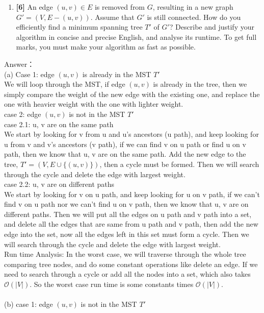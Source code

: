 \documentclass{assignment-263}
\begin{document}
\begin{enumerate}
\begin{enumerate}
			\item \textbf{[6]}
				An edge $(u, v)\in E$ is removed from $G$, resulting in a
				new graph $G'=(V, E-(u, v))$. Assume that $G'$ is still
				connected. How do you efficiently find a minimum spanning
				tree $T'$ of $G'$?  Describe and justify your algorithm in
				concise and precise English, and analyse its runtime. To get
				full marks, you must make your algorithm as fast as
				possible.
		\end{enumerate}
		Answer：\\
		(a)
		Case 1: edge $(u, v)$ is already in the MST $T'$ \\
		We will loop through the MST, if edge $(u, v)$ is already in the tree, then we simply compare the weight of the new edge with the existing one, and replace the one with heavier weight with the one with lighter weight.\\
		case 2: edge $(u, v)$ is not in the MST $T'$\\
	    case 2.1: u, v are on the same path\\
		We start by looking for v from u and u's ancestors (u path), and keep looking for u from v and v's ancestors (v path), if we can find v on u path or find u on v path, then we know that u, v are on the same path. Add the new edge to the tree, $T'=(V, E\cup \{(u,v)\})$, then a cycle must be formed. Then we will search through the cycle and delete the edge with largest weight.\\
		case 2.2: u, v are on different paths\\
		We start by looking for v on u path, and keep looking for u on v path, if we can't find v on u path nor we can't find u on v path, then we know that u, v are on different paths. Then we will put all the edges on u path and v path into a set, and delete all the edges that are same from u path and v path, then add the new edge into the set, now all the edges left in this set must form a cycle. Then we will search through the cycle and delete the edge with largest weight.\\
		Run time Analysis: In the worst case, we will traverse through the whole tree comparing tree nodes, and do some constant operations like delete an edge. If we need to search through a cycle or add all the nodes into a set, which also takes $\mathcal{O}(|V|)$.  So the worst case run time is some constants times $\mathcal{O}(|V|)$.\\\\
		(b)
		case 1: edge $(u, v)$ is not in the MST $T'$ \\

\end{enumerate}
\end{document}
